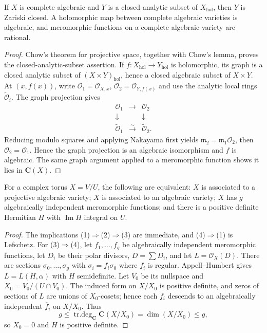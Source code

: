 \begin{theorem}[Chow]
\label{mumford-source-chow}
If $X$ is complete algebraic and $Y$ is a closed analytic subset of
$X_{\mathrm{hol}}$, then $Y$ is Zariski closed. A holomorphic map between
complete algebraic varieties is algebraic, and meromorphic functions on a
complete algebraic variety are rational.
\end{theorem}
\begin{proof}
Chow's theorem for projective space, together with Chow's lemma, proves the
closed-analytic-subset assertion.  If $f:X_{\mathrm{hol}}\to Y_{\mathrm{hol}}$
is holomorphic, its graph is a closed analytic subset of
$(X\times Y)_{\mathrm{hol}}$, hence a closed algebraic subset of $X\times Y$.
At $(x,f(x))$, write $\mathcal O_1=\mathcal O_{X,x}$,
$\mathcal O_2=\mathcal O_{Y,f(x)}$ and use the analytic local rings
$\widetilde{\mathcal O}_i$.  The graph projection gives
\[
\begin{array}{ccc}
\mathcal O_1&\longrightarrow&\mathcal O_2\\
\downarrow&&\downarrow\\
\widetilde{\mathcal O}_1&\xrightarrow{\sim}&\widetilde{\mathcal O}_2.
\end{array}
\]
Reducing modulo squares and applying Nakayama first yields
$\mathfrak m_2=\mathfrak m_1\mathcal O_2$, then
$\mathcal O_2=\mathcal O_1$.  Hence the graph projection is an algebraic
isomorphism and $f$ is algebraic.  The same graph argument applied to a
meromorphic function shows it lies in $\mathbf C(X)$.
\end{proof}

\begin{corollary}
\label{mumford-source-algebraizability}
For a complex torus $X=V/U$, the following are equivalent: $X$ is associated to
a projective algebraic variety; $X$ is associated to an algebraic variety;
$X$ has $g$ algebraically independent meromorphic functions; and there is a
positive definite Hermitian $H$ with $\operatorname{Im}H$ integral on $U$.
\end{corollary}
\begin{proof}
The implications (1)$\Rightarrow$(2)$\Rightarrow$(3) are immediate, and
(4)$\Rightarrow$(1) is Lefschetz.  For (3)$\Rightarrow$(4), let
$f_1,\ldots,f_g$ be algebraically independent meromorphic functions, let
$D_i$ be their polar divisors, $D=\sum D_i$, and let $L=\mathcal O_X(D)$.
There are sections $\sigma_0,\ldots,\sigma_g$ with
$\sigma_i=f_i\sigma_0$ where $f_i$ is regular.  Appell--Humbert gives
$L=L(H,\alpha)$ with $H$ semidefinite.  Let $V_0$ be its nullspace and
$X_0=V_0/(U\cap V_0)$.  The induced form on $X/X_0$ is positive definite,
and zeros of sections of $L$ are unions of $X_0$-cosets; hence each $f_i$
descends to an algebraically independent $\overline f_i$ on $X/X_0$.  Thus
\[
 g\le\operatorname{tr.deg}_{\mathbf C}\mathbf C(X/X_0)
 =\dim(X/X_0)\le g,
\]
so $X_0=0$ and $H$ is positive definite.
\end{proof}

